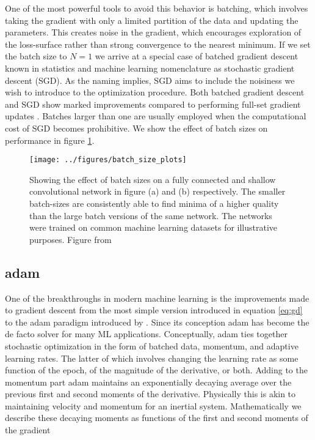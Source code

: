 One of the most powerful tools to avoid this behavior is batching, which involves taking the gradient with only a limited partition of the data and updating the parameters. This creates noise in the gradient, which encourages exploration of the loss-surface rather than strong convergence to the nearest minimum. If we set the batch size to $N=1$ we arrive at a special case of batched gradient descent known in statistics and machine learning nomenclature as stochastic gradient descent (SGD). As the naming implies, SGD aims to include the noisiness we wish to introduce to the optimization procedure. Both batched gradient descent and SGD show marked improvements compared to performing full-set gradient updates \cite{Keskar2016}. 
Batches larger than one are usually employed when the computational cost of SGD becomes prohibitive. We show the effect of batch sizes on performance in figure \ref{fig:batch_size}. 

\begin{figure}[ht]
\centering
\texttt{[image: ../figures/batch\_size\_plots]}
\caption[Effect of the batch size on performance]{Showing the effect of batch sizes on a fully connected and shallow convolutional network in figure (a) and (b) respectively. The smaller batch-sizes are consistently able to find minima of a higher quality than the large batch versions of the same network. The networks were trained on common machine learning datasets for illustrative purposes. Figure from \citet{Keskar2016} }\label{fig:batch_size}
\end{figure}

\subsection{adam}\label{sec:adam}
One of the breakthroughs in modern machine learning is the improvements made to gradient descent from the most simple version introduced in equation \ref{eq:gd} to the adam paradigm introduced by \citet{Kingma2015}. Since its conception adam has become the de facto solver for many ML applications. Conceptually, adam ties together stochastic optimization in the form of batched data, momentum, and adaptive learning rates. The latter of which involves changing the learning rate as some function of the epoch, of the magnitude of the derivative, or both. Adding to the momentum part adam maintains an exponentially decaying average over the previous first and second moments of the derivative. Physically this is akin to maintaining velocity and momentum for an inertial system. Mathematically we describe these decaying moments as functions of the first and second  moments of the gradient 

